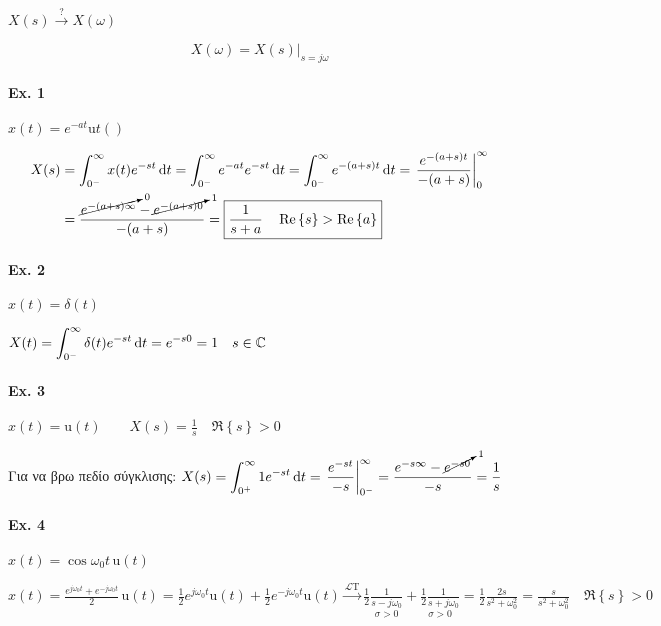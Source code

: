     \paragraph{}
    \( \displaystyle X(s) \xrightarrow{?} X(\omega ) \)

    \[
    X(\omega ) = \left. X(s)\right|_{s=j\omega }
    \]

    \paragraph{Ex. 1}
    \( x(t)= e^{-at}\mathrm ut() \)

    \begin{align*}
    X(s) &= \int_{0^-}^\infty x(t)e^{-st}\mathop{}\!\mathrm{d} t
    =\int_{0^-}^\infty e^{-at}e^{-st}\mathop{}\!\mathrm{d} t
    = \int_{0^-}^\infty e^{-(a+s)t}\mathop{}\!\mathrm{d} t
    =\left. \frac{e^{-(a+s)t}}{-(a+s)}\right|_0^\infty
    \\ &= \frac{\cancelto{0}{e^{-(a+s)\infty}} -\cancelto{1}{e^{-(a+s)0}} }{-(a+s)}
    = \boxed{\frac{1}{s+a} \quad
        \operatorname{Re}\left\lbrace s \right\rbrace > \operatorname{Re}\left\lbrace a \right\rbrace}
    \end{align*}


   \paragraph{Ex. 2}
   \( x(t)=\delta(t) \)

   \( \displaystyle
   X(t) = \int_{0^-}^\infty \delta(t)e^{-st}\mathop{}\!\mathrm{d} t = e^{-s0} = 1 \quad s\in\mathbb C
    \)

   \paragraph{Ex. 3}
   \( x(t)=\mathrm u(t) \qquad X(s)=\frac{1}{s}
   \quad \Re\left\lbrace s \right\rbrace > 0\)

   Για να βρω πεδίο σύγκλισης: \( \displaystyle
   X(s) =
   \int_{0^+}^\infty 1e^{-st}\mathop{}\!\mathrm{d} t = \left.
   \frac{e^{-st}}{-s}\right|_{0^-}^\infty
   = \frac{e^{-s\infty}-\cancelto{1}{e^{-s0}}}{-s}=\frac{1}{s}
    \)

   \paragraph{Ex. 4}
   \( x(t)=\cos\omega_0 t\, \mathrm u(t) \)

   \( \displaystyle
   x(t) = \frac{e^{j\omega_0 t}+e^{-j\omega_0 t}}{2}\, \mathrm u(t)
   =\frac{1}{2}e^{j\omega_0 t}\mathrm u(t)
   +\frac{1}{2}e^{-j\omega_0 t}\mathrm u(t)
   \xrightarrow{\mathscr L \mathrm T}
    \frac{1}{2}
    \underset{\sigma >0}{\frac{1}{s-j\omega_0}}+
    \underset{\sigma >0}{\frac{1}{2}\frac{1}{s+j\omega_0}}
    = \frac{1}{2} \frac{2s}{s^2+\omega_0^2}
    =\frac{s}{s^2+\omega_0^2} \quad \Re\left\lbrace s \right\rbrace>0
    \)

